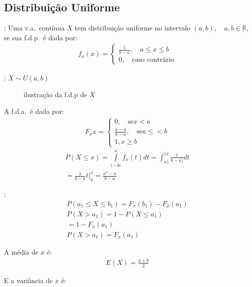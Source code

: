    \subsection{Distribuição Uniforme} 
   \begin{description}
     \item [Definição]: Uma v.a.\ contínua $X$ tem distribuição uniforme no intervalo $(a,b), \quad a,b \in \mathbb{R}$,
       se sua f.d.p.\ é dada por:
\begin{align}
  f_x(x) = \begin{cases}
\frac{1}{b-a}, \quad a \leq x \leq b  \\
   0, \quad \text{caso contrário}
  \end{cases}
\end{align}
\item[Notação]: $X \mathtt{\sim} U(a,b)$
  \begin{figure}[H]
    \centering
    
    \caption{ilustração da f.d.p de $X$}
  \end{figure}
\item A f.d.a.\ é dada por:
  \begin{align}
    F_x{x} = \begin{cases}
      0, \quad \text{se} x<a \\
      \frac{x-a}{b-a}, \quad \text{se} a\leq<b\\
      1, x \ge b
    \end{cases}
  \end{align}
  \begin{align}
    P(X \leq x) = \int \limits_{(- \infty}^{x} f_{x} (t) dt = \int_{a)}^{(x} \frac{1}{b-a)} dt\\
    \nonumber = \frac{1}{b-a}t |_{a}^{x} = \frac{x^a -a}{b-a}
  \end{align}
\item[Exemplo]:
  \begin{align*}
    P(a_1 \leq X \leq b_1) = F_{x} (b_1) - F_{x}(a_1) \\
    P(X > a_1)= 1- P(X \leq a_1) \\
    = 1-F_{x} (a_1) \\
    P(X > a_1)= F_{x}(a_1)
  \end{align*}
 \item A média de $x$ é:
   \begin{align*}
     E(X) = \frac{a+b}{2}
   \end{align*}
 \item E a variância de $x$ é:
   \begin{align*}

\end{align*}
\end{description}
